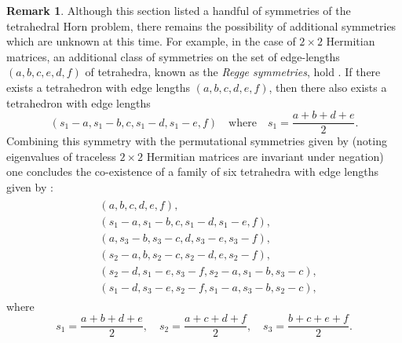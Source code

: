 \documentclass[pdflatex, sn-mathphys-num]{sn-jnl} %
\theoremstyle{plain}
\theoremstyle{definition}
\newtheorem{rem}[thm]{Remark}%
\let\cref\crtcref
\begin{document}
\begin{rem}
    Although this section listed a handful of symmetries of the tetrahedral Horn problem, there remains the possibility of additional symmetries which are unknown at this time.
    For example, in the case of $2\times 2$ Hermitian matrices, an additional class of symmetries on the set of edge-lengths $(a,b,c,e,d,f)$ of tetrahedra, known as the \textit{Regge symmetries}, hold \cite{akopyan2019regge,boalch2007regge,ponzano1968semiclassical}.
    If there exists a tetrahedron with edge lengths $(a,b,c,d,e,f)$, then there also exists a tetrahedron with edge lengths
    \begin{equation}
        (s_1-a,s_1-b,c,s_1-d,s_1-e,f) \quad \text{where} \quad s_1 = \frac{a+b+d+e}{2}.
    \end{equation}
    Combining this symmetry with the permutational symmetries given by \cref{prop:tet_symmetry} (noting eigenvalues of traceless $2 \times 2$ Hermitian matrices are invariant under negation) one concludes the co-existence of a family of six tetrahedra with edge lengths given by \cite[Chapter 9]{varshalovich1988quantum}:
    \begin{align}
        \begin{split}
            &(a,b,c,d,e,f), \\
            &(s_1-a,s_1-b,c,s_1-d,s_1-e,f), \\
            &(a,s_3-b,s_3-c,d,s_3-e,s_3-f), \\
            &(s_2-a,b,s_2-c,s_2-d,e,s_2-f), \\
            &(s_2-d,s_1-e,s_3-f,s_2-a,s_1-b,s_3-c), \\
            &(s_1-d,s_3-e,s_2-f,s_1-a,s_3-b,s_2-c),
        \end{split}
    \end{align}
    where
    \begin{equation}
        s_1 = \frac{a+b+d+e}{2}, \quad
        s_2 = \frac{a+c+d+f}{2}, \quad
        s_3 = \frac{b+c+e+f}{2}.
    \end{equation}
\end{rem}
\end{document}
